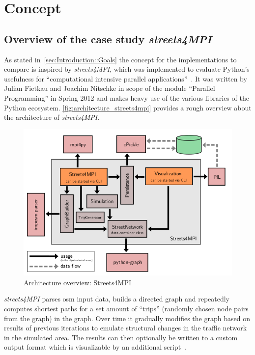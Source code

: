 \chapter{Concept}
\label{ch:Concept}


\section{Overview of the case study \textit{streets4MPI}}
\label{sec:Concept::Overview}

As stated in~\autoref{sec:Introduction::Goals} the concept for the implementations to compare is inspired by \textit{streets4MPI}, which was implemented to evaluate Python's usefulness for ``computational intensive parallel applications''~\cite[p.3]{streets_report}. It was written by Julian Fietkau and Joachim Nitschke in scope of the module ``Parallel Programming'' in Spring 2012 and makes heavy use of the various libraries of the Python ecosystem. \autoref{fig:architecture_streets4mpi} provides a rough overview about the architecture of \textit{streets4MPI}.

\begin{figure}[htb]
    \centering
    \includegraphics[width=.75\textwidth]{img/architecture_streets4mpi.png}
    \caption{Architecture overview: Streets4MPI~\cite[p. 9]{streets_report}}
    \label{fig:architecture_streets4mpi}
\end{figure}

\textit{streets4MPI} parses \gls{osm} input data, builds a directed graph and repeatedly computes shortest paths for a set amount of ``trips'' (randomly chosen node pairs from the graph) in the graph. Over time it gradually modifies the graph based on results of previous iterations to emulate structural changes in the traffic network in the simulated area. The results can then optionally be written to a custom output format which is visualizable by an additional script~\cite{streets_report}.

